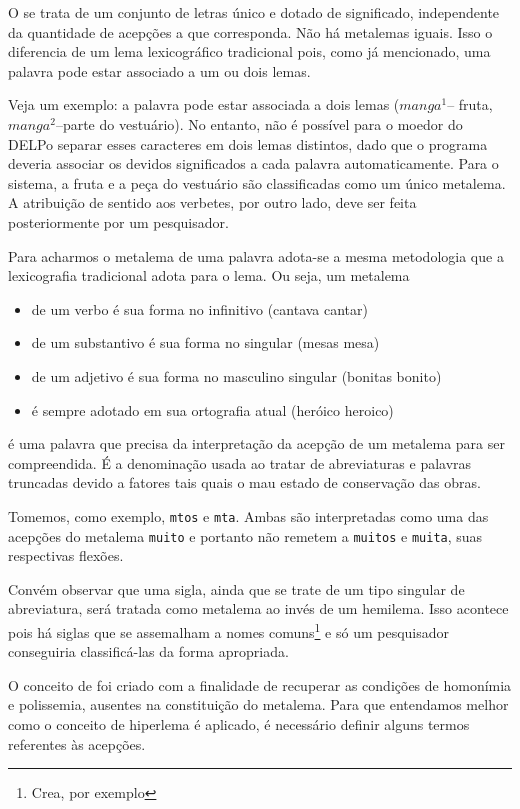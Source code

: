 O  se trata de um conjunto de letras único e dotado de significado,
independente da quantidade de acepções a que corresponda. Não há metalemas iguais.
Isso o diferencia de um lema lexicográfico tradicional pois, como já mencionado,
uma palavra pode estar associado a um ou dois lemas.

Veja um exemplo: a palavra  pode estar associada a dois lemas ($manga^1$--
fruta, $manga^2$--parte do vestuário). No entanto, não é possível para o moedor do
DELPo separar esses caracteres em dois lemas distintos, dado que o programa deveria
associar os devidos significados a cada palavra automaticamente. Para o sistema, a
fruta e a peça do vestuário são classificadas como um único metalema. A atribuição
de sentido aos verbetes, por outro lado, deve ser feita posteriormente por um
pesquisador.

Para acharmos o metalema de uma palavra adota-se a mesma metodologia que a lexicografia
tradicional adota para o lema. Ou seja, um metalema
\begin{itemize}
    \item de um verbo é sua forma no infinitivo (cantava \dir cantar)
    \item de um substantivo é sua forma no singular (mesas \dir mesa)
    \item de um adjetivo é sua forma no masculino singular (bonitas \dir bonito)
    \item é sempre adotado em sua ortografia atual (heróico \dir heroico)
\end{itemize}

 é uma palavra que precisa da interpretação da acepção de um metalema para ser
compreendida. É a denominação usada ao tratar de abreviaturas e palavras truncadas devido a
fatores tais quais o mau estado de conservação das obras.

Tomemos, como exemplo, \texttt{mtos} e \texttt{mta}. Ambas são interpretadas como uma das
acepções do metalema \texttt{muito} e portanto não remetem a \texttt{muitos} e \texttt{muita},
suas respectivas flexões.

Convém observar que uma sigla, ainda que se trate de um tipo singular de abreviatura, será
tratada como metalema ao invés de um hemilema. Isso acontece pois há siglas que se assemalham
a nomes comuns\footnote{Crea, por exemplo} e só um pesquisador conseguiria classificá-las
da forma apropriada.

O conceito de  foi criado com a finalidade de recuperar as condições de homonímia
e polissemia, ausentes na constituição do metalema. Para que entendamos melhor como o conceito
de hiperlema é aplicado, é necessário definir alguns termos referentes às acepções.

